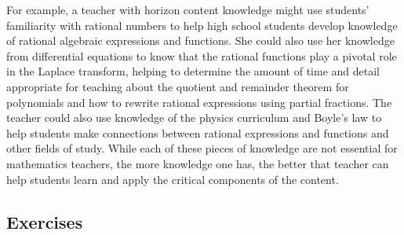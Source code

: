 \documentclass[
]{book}
\theoremstyle{definition}
\theoremstyle{definition}
\theoremstyle{definition}
\theoremstyle{remark}
\begin{document}
For example, a teacher with horizon content knowledge might use students' familiarity with rational numbers to help high school students develop knowledge of rational algebraic expressions and functions. She could also use her knowledge from differential equations to know that the rational functions play a pivotal role in the Laplace transform, helping to determine the amount of time and detail appropriate for teaching about the quotient and remainder theorem for polynomials and how to rewrite rational expressions using partial fractions. The teacher could also use knowledge of the physics curriculum and Boyle's law to help students make connections between rational expressions and functions and other fields of study. While each of these pieces of knowledge are not essential for mathematics teachers, the more knowledge one has, the better that teacher can help students learn and apply the critical components of the content.

\hypertarget{exercises}{%
\subsection{Exercises}\label{exercises}}
\end{document}
